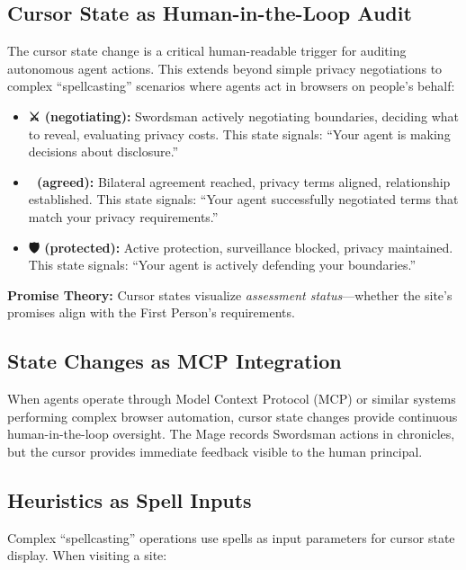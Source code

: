 \documentclass[
  11pt,
]{article}
\begin{document}
\subsection{Cursor State as Human-in-the-Loop
Audit}\label{cursor-state-as-human-in-the-loop-audit}

The cursor state change is a critical human-readable trigger for
auditing autonomous agent actions. This extends beyond simple privacy
negotiations to complex ``spellcasting'' scenarios where agents act in
browsers on people's behalf:

\begin{itemize}
\item
  \textbf{⚔️ (negotiating):} Swordsman actively negotiating boundaries,
  deciding what to reveal, evaluating privacy costs. This state signals:
  ``Your agent is making decisions about disclosure.''
\item
  \textbf{🤝 (agreed):} Bilateral agreement reached, privacy terms
  aligned, relationship established. This state signals: ``Your agent
  successfully negotiated terms that match your privacy requirements.''
\item
  \textbf{🛡️ (protected):} Active protection, surveillance blocked,
  privacy maintained. This state signals: ``Your agent is actively
  defending your boundaries.''
\end{itemize}

\textbf{Promise Theory:} Cursor states visualize \emph{assessment
status}---whether the site's promises align with the First Person's
requirements.

\subsection{State Changes as MCP
Integration}\label{state-changes-as-mcp-integration}

When agents operate through Model Context Protocol (MCP) or similar
systems performing complex browser automation, cursor state changes
provide continuous human-in-the-loop oversight. The Mage records
Swordsman actions in chronicles, but the cursor provides immediate
feedback visible to the human principal.

\subsection{Heuristics as Spell
Inputs}\label{heuristics-as-spell-inputs}

Complex ``spellcasting'' operations use spells as input parameters for
cursor state display. When visiting a site:
\end{document}
